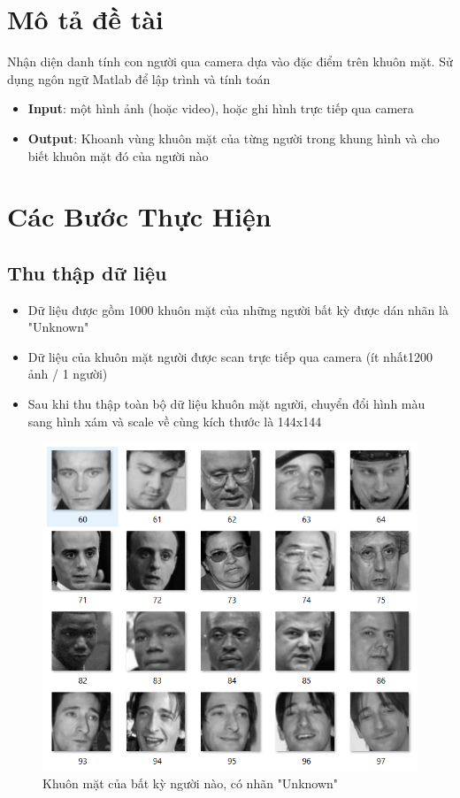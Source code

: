 \documentclass[a4paper]{article}
\begin{document}
\newpage
\tableofcontents
\newpage

\section{Mô tả đề tài}
\hspace{6mm} Nhận diện danh tính con người qua camera dựa vào đặc điểm trên khuôn mặt. Sử dụng ngôn ngữ Matlab để lập trình và tính toán 

\begin{itemize}
    \item \textbf{Input}: một hình ảnh (hoặc video), hoặc ghi hình trực tiếp qua camera
    \item \textbf{Output}: Khoanh vùng khuôn mặt của từng người trong khung hình và cho biết khuôn mặt đó của người nào
\end{itemize}

\section{Các Bước Thực Hiện}
\subsection{Thu thập dữ liệu}
\begin{itemize}
    \item Dữ liệu được gồm 1000 khuôn mặt của những người bất kỳ được dán nhãn là "Unknown"
    \item Dữ liệu của khuôn mặt người được scan trực tiếp qua camera (ít nhất1200 ảnh / 1 người) 
    \item Sau khi thu thập toàn bộ dữ liệu khuôn mặt người, chuyển đổi hình màu sang hình xám và scale về cùng kích thước là 144x144
\end{itemize}
\begin{figure} [H]
\centering
\includegraphics[scale=0.45]{unknown.png}
\caption{Khuôn mặt của bất kỳ người nào, có nhãn "Unknown"}
\label{fig:ts}
\end{figure}
\end{document}
